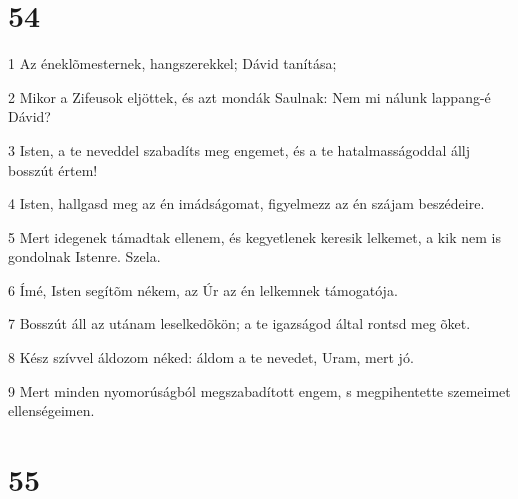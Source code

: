 \chapter{54}

\par 1 Az éneklõmesternek, hangszerekkel; Dávid tanítása;
\par 2 Mikor a Zifeusok eljöttek, és azt mondák Saulnak: Nem mi nálunk lappang-é Dávid?
\par 3 Isten, a te neveddel szabadíts meg engemet, és a te hatalmasságoddal állj bosszút értem!
\par 4 Isten, hallgasd meg az én imádságomat, figyelmezz az én szájam beszédeire.
\par 5 Mert idegenek támadtak ellenem, és kegyetlenek keresik lelkemet, a kik nem is gondolnak Istenre. Szela.
\par 6 Ímé, Isten segítõm nékem, az Úr az én lelkemnek támogatója.
\par 7 Bosszút áll az utánam leselkedõkön; a te igazságod által rontsd meg õket.
\par 8 Kész szívvel áldozom néked: áldom a te nevedet, Uram, mert jó.
\par 9 Mert minden nyomorúságból megszabadított engem, s megpihentette szemeimet ellenségeimen.

\chapter{55}

